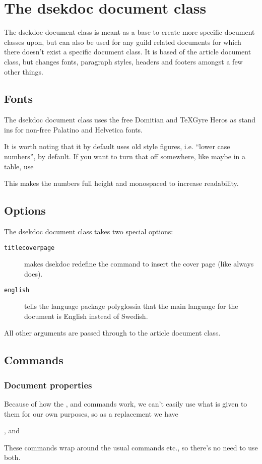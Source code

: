\documentclass[a4paper, oneside]{ltxdoc}
\begin{document}
\section{The \textsf{dsekdoc} document class}
The \textsf{dsekdoc} document class is meant as a base to create more specific
document classes upon, but can also be used for any guild related documents for
which there doesn't exist a specific document class.  It is based of the
\textsf{article} document class, but changes fonts, paragraph styles, headers
and footers amongst a few other things.

\subsection{Fonts}
The \textsf{dsekdoc} document class uses the free Domitian and \TeX Gyre Heros
as stand ins for non-free Palatino and Helvetica fonts.

It is worth noting that it by default uses old style figures, i.e. ``lower case
numbers'', by default.  If you want to turn that off somewhere, like maybe in a
table, use


This makes the numbers full height and monospaced to increase readability.

\subsection{Options}
The \textsf{dsekdoc} document class takes two special options:
\begin{description}
  \item[\texttt{titlecoverpage}] makes \textsf{dsekdoc} redefine the
         command to insert the cover page (like 
        always does).
  \item[\texttt{english}] tells the language package \textsf{polyglossia} that
        the main language for the document is English instead of Swedish.
\end{description}
All other arguments are passed through to the \textsf{article} document class.

\subsection{Commands}
\subsubsection{Document properties}
Because of how the ,  and  commands work, we can't
easily use what is given to them for our own purposes, so as a replacement we
have
\begin{center}
  ,  and 
\end{center}
These commands wrap around the usual  commands etc., so there's no
need to use both.
\end{document}

